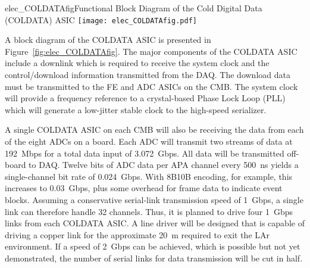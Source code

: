 \begin{cdrfigure}{elec_COLDATAfig}{Functional Block Diagram of the Cold Digital Data (COLDATA) ASIC}
\texttt{[image: elec\_COLDATAfig.pdf]}
\end{cdrfigure}

A block diagram of the COLDATA ASIC is presented in Figure~\ref{fig:elec_COLDATAfig}.
The major components of the COLDATA ASIC include a downlink which is required to receive the system clock and
the control/download information transmitted from the DAQ.  
The download data must be transmitted to the FE and ADC ASICs on the CMB.
The system clock will provide a frequency reference to a crystal-based Phase Lock Loop (PLL)
which will generate a low-jitter stable clock to the high-speed serializer. 

A single COLDATA ASIC on each CMB will also be receiving the data from each of the eight ADCs on a board.
Each ADC will transmit two streams of data at 192~Mbps for a total data input of 3.072~Gbps.
All data will be transmitted off-board to DAQ. 
Twelve bits of ADC data per APA channel every 500~ns yields a single-channel bit rate of 0.024~Gbps.
With 8B10B encoding, for example, this increases to 0.03~Gbps, plus some overhead for frame data to indicate event blocks.
Assuming a conservative serial-link transmission speed of 1~Gbps, a single link can therefore handle 32 channels.
Thus, it is planned to drive four 1~Gbps links from each COLDATA ASIC.
A line driver will be designed that is capable of driving a copper link for the approximate 20~m required
to exit the LAr environment.
If a speed of 2~Gbps can be achieved, which is possible but not yet demonstrated,
the number of serial links for data transmission will be cut in half.

